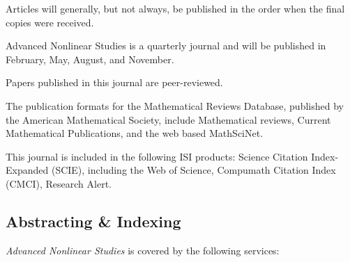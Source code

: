 \documentclass{book}
\numberwithin{equation}{section}
\begin{document}
Articles will generally, but not always, be published in the order when the final copies were received.

%
Advanced Nonlinear Studies is a quarterly journal and will be published in February, May, August, and November.

Papers published in this journal are peer-reviewed.

The publication formats for the Mathematical Reviews Database, published by the American Mathematical Society, include Mathematical reviews, Current Mathematical Publications, and the web based MathSciNet.

This journal is included in the following ISI products: Science Citation Index-Expanded (SCIE), including the Web of Science, Compumath Citation Index (CMCI), Research Alert.

\subsection{Abstracting \& Indexing}
\textit{Advanced Nonlinear Studies} is covered by the following services:
\end{document}
